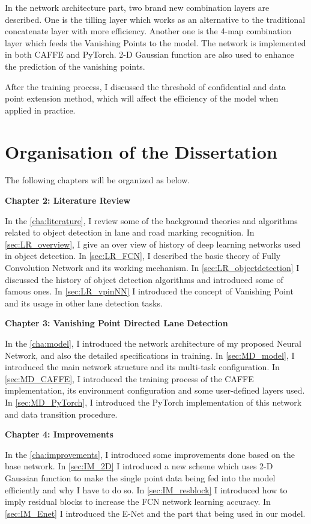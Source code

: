 \begin{spacing}{1.5}
In the network architecture part, two brand new combination layers are described. One is the tilling layer which works as an alternative to the traditional concatenate layer with more efficiency. Another one is the 4-map combination layer which feeds the Vanishing Points to the model. The network is implemented in both CAFFE and PyTorch. 2-D Gaussian function are also used to enhance the prediction of the vanishing points.

After the training process, I discussed the threshold of confidential and data point extension method, which will affect the efficiency of the model when applied in practice.

\section{Organisation of the Dissertation}
\label{sec:IN_organisation}

The following chapters will be organized as below.

{\large\textbf{Chapter 2: Literature Review}}

In the \autoref{cha:literature}, I review some of the background theories and algorithms related to object detection in lane and road marking recognition. In \autoref{sec:LR_overview}, I give an over view of history of deep learning networks used in object detection. In \autoref{sec:LR_FCN}, I described the basic theory of Fully Convolution Network and its working mechanism. In \autoref{sec:LR_objectdetection} I discussed the history of object detection algorithms and introduced some of famous ones. In \autoref{sec:LR_vpinNN} I introduced the concept of Vanishing Point and its usage in other lane detection tasks.

{\large\textbf{Chapter 3: Vanishing Point Directed Lane Detection}}

In the \autoref{cha:model}, I introduced the network architecture of my proposed Neural Network, and also the detailed specifications in training. In \autoref{sec:MD_model}, I introduced the main network structure and its multi-task configuration. In \autoref{sec:MD_CAFFE}, I introduced the training process of the CAFFE implementation, its environment configuration and some user-defined layers used. In \autoref{sec:MD_PyTorch}, I introduced the PyTorch implementation of this network and data transition procedure.

{\large\textbf{Chapter 4: Improvements}}

In the \autoref{cha:improvements}, I introduced some improvements done based on the base network. In \autoref{sec:IM_2D} I introduced a new scheme which uses 2-D Gaussian function to make the single point data being fed into the model efficiently and why I have to do so. In \autoref{sec:IM_resblock} I  introduced how to imply residual blocks to increase the FCN network learning accuracy. In \autoref{sec:IM_Enet} I introduced the E-Net and the part that being used in our model.


\end{spacing}
